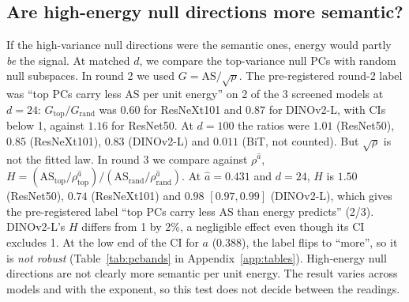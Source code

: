 \documentclass[10pt]{article}
\begin{document}
\subsection{Are high-energy null directions more semantic?}
\label{sec:pcbands}\label{app:pcbands}
If the high-variance null directions were the semantic ones, energy would partly \emph{be} the signal.
At matched $d$, we compare the top-variance null PCs with random null subspaces.
In round 2 we used $G=\mathrm{AS}/\sqrt\rho$.
The pre-registered round-2 label was ``top PCs carry less AS per unit energy'' on 2 of the 3 screened models at $d{=}24$: $G_{\mathrm{top}}/G_{\mathrm{rand}}$ was $0.60$ for ResNeXt101 and $0.87$ for DINOv2-L, with CIs below 1, against $1.16$ for ResNet50.
At $d{=}100$ the ratios were $1.01$ (ResNet50), $0.85$ (ResNeXt101), $0.83$ (DINOv2-L) and $0.011$ (BiT, not counted).
But $\sqrt\rho$ is not the fitted law.
In round 3 we compare against $\rho^{\hat a}$, $H=(\mathrm{AS}_{\mathrm{top}}/\rho_{\mathrm{top}}^{\hat a})/(\mathrm{AS}_{\mathrm{rand}}/\rho_{\mathrm{rand}}^{\hat a})$.
At $\hat a{=}0.431$ and $d{=}24$, $H$ is $1.50$ (ResNet50), $0.74$ (ResNeXt101) and $0.98$ $[0.97,0.99]$ (DINOv2-L), which gives the pre-registered label ``top PCs carry less AS than energy predicts'' (2/3).
DINOv2-L's $H$ differs from 1 by 2\%, a negligible effect even though its CI excludes 1.
At the low end of the CI for $a$ ($0.388$), the label flips to ``more'', so it is \emph{not robust} (Table~\ref{tab:pcbands} in Appendix~\ref{app:tables}).
High-energy null directions are not clearly more semantic per unit energy. The result varies across models and with the exponent, so this test does not decide between the readings.
\end{document}
